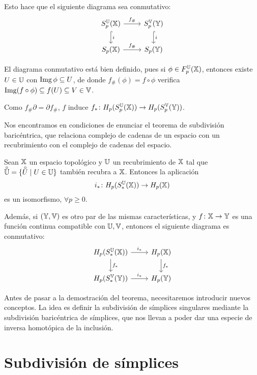 Esto hace que el siguiente diagrama sea conmutativo:
\[ \begin{tikzcd}
  S_p^\U(\X) \arrow{r}{f_\#} \arrow[hook]{d}{i} & S_p^\V(\Y) \arrow[hook]{d}{i} \\
  \SX{p} \arrow{r}{f_\#} & \SY{p}
\end{tikzcd} \]

\begin{remark}
  El diagrama conmutativo está bien definido, pues si $\phi \in F_p^{\mathbb U}({\mathbb X})$, entonces existe $U \in {\mathbb U}$ con $\operatorname{Img} \phi \subseteq U$, de donde
  $f_\#(\phi) = f \circ \phi$ verifica $\operatorname{Img}(f \circ \phi) \subseteq f(U) \subseteq V \in {\mathbb V}$.
\end{remark}

Como $f_\# \partial = \partial f_\#$, $f$ induce $f_* \colon H_p(S_p^{\mathbb U}({\mathbb X})) \to H_p(S_p^{\mathbb V}({\mathbb Y}))$.

Nos encontramos en condiciones de enunciar el teorema de subdivisión baricéntrica, que relaciona complejo de cadenas
de un espacio con un recubrimiento con el complejo de cadenas del espacio.

\begin{theorem}
  Sean ${\mathbb X}$ un espacio topológico y ${\mathbb U}$ un recubrimiento de ${\mathbb X}$ tal que $\interior{\U} = \{\interior{U} \mid U \in \U\}$
  también recubra a ${\mathbb X}$. Entonces la aplicación
  \[ i_* \colon H_p(S_*^{\mathbb U}({\mathbb X})) \to H_p({\mathbb X}) \]
  es un isomorfismo, $\forall p \geq 0$.

  Además, si $({\mathbb Y}, {\mathbb V})$ es otro par de las mismas características, y $f \colon {\mathbb X} \to {\mathbb Y}$ es una función continua
  compatible con ${\mathbb U}, {\mathbb V}$, entonces el siguiente diagrama es conmutativo:
  \[ \begin{tikzcd}
    H_p(S_*^\U(\X)) \arrow{r}{i_*} \arrow{d}{f_*} & H_p(\X) \arrow{d}{f_*} \\
    H_p(S_*^\V(\Y)) \arrow{r}{i_*} & H_p(\Y)
  \end{tikzcd} \]

\end{theorem}

Antes de pasar a la demostración del teorema, necesitaremos introducir nuevos conceptos. La idea es definir la subdivisión
de símplices singulares mediante la subdivisión baricéntrica de símplices, que nos llevan a poder dar una especie de
inversa homotópica de la inclusión.

\section{Subdivisión de símplices}

